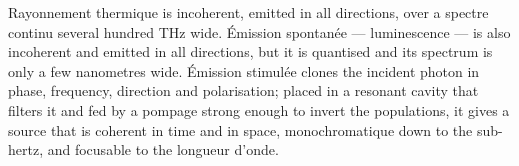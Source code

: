 \begin{conclusion}
  Rayonnement thermique is incoherent, emitted in all directions, over a
  spectre continu several hundred THz wide. Émission spontanée ---
  luminescence --- is also incoherent and emitted in all directions, but it is
  quantised and its spectrum is only a few nanometres wide. Émission stimulée
  clones the incident photon in phase, frequency, direction and polarisation;
  placed in a resonant cavity that filters it and fed by a pompage strong enough
  to invert the populations, it gives a source that is coherent in time and in
  space, monochromatique down to the sub-hertz, and focusable to the longueur
  d'onde.
\end{conclusion}
